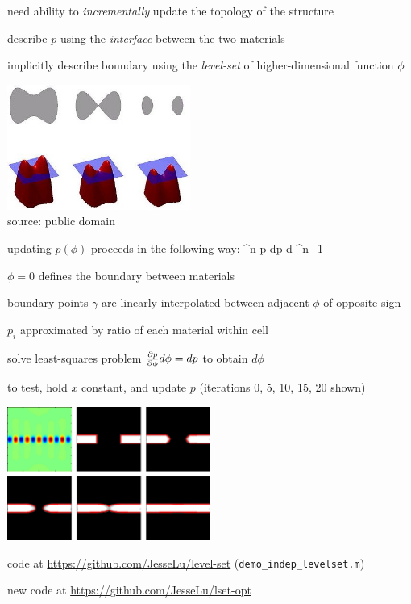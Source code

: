 \documentclass[landscape]{foils}
\begin{document}
\BIT
\item need ability to \emph{incrementally} update the topology of the structure
\item describe $p$ using the \emph{interface} between the two materials
\item implicitly describe boundary using the \emph{level-set} of higher-dimensional function $\phi$
\begin{center}
\includegraphics[width=0.45\textwidth]{figures/level-set.jpg} \\
source: public domain
\end{center}
\EIT
\newpage

\BIT
\item updating $p(\phi)$ proceeds in the following way:
\BEQ
\phi^n  \gamma 
     p
     dp
     d\phi
     \phi^{n+1}
\EEQ
\item $\phi = 0$ defines the boundary between materials
\item boundary points $\gamma$ are linearly interpolated between adjacent $\phi$ of opposite sign
\item $p_i$ approximated by ratio of each material within cell
\item solve least-squares problem $\frac{\partial p}{\partial \phi} d\phi = dp$ to obtain $d\phi$
\EIT
\newpage

\BIT
\item to test, hold $x$ constant, and update $p$ (iterations 0, 5, 10, 15, 20 shown)
\begin{center}
\includegraphics[width=0.5\textwidth]{figures/structure-progression.jpg} 
\end{center}
\item code at \url{https://github.com/JesseLu/level-set} (\texttt{demo\_indep\_levelset.m})
\item new code at \url{https://github.com/JesseLu/lset-opt}
\EIT
\end{document}
